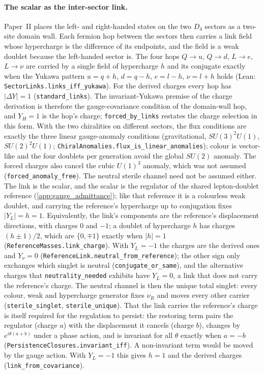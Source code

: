 \paragraph{The scalar as the inter-sector link.} Paper~II places the left- and right-handed states on the two $D_4$ sectors as a two-site domain wall. Each fermion hop between the sectors then carries a link field whose hypercharge is the difference of its endpoints, and the field is a weak doublet because the left-handed sector is. The four hops $Q\to u$, $Q\to d$, $L\to e$, $L\to\nu$ are carried by a single field of hypercharge $h$ and its conjugate exactly when the Yukawa pattern $u=q+h$, $d=q-h$, $e=l-h$, $\nu=l+h$ holds (Lean: \texttt{SectorLinks.links\_iff\_yukawa}). For the derived charges every hop has $|\Delta Y|=1$ (\texttt{standard\_links}). The invariant-Yukawa premise of the charge derivation is therefore the gauge-covariance condition of the domain-wall hop, and $Y_H=1$ is the hop's charge; \texttt{forced\_by\_links} restates the charge selection in this form. With the two chiralities on different sectors, the flux conditions are exactly the three linear gauge-anomaly conditions (gravitational, $SU(3)^2U(1)$, $SU(2)^2U(1)$; \texttt{ChiralAnomalies.flux\_is\_linear\_anomalies}); colour is vector-like and the four doublets per generation avoid the global $SU(2)$ anomaly. The forced charges also cancel the cubic $U(1)^3$ anomaly, which was not assumed (\texttt{forced\_anomaly\_free}). The neutral sterile channel need not be assumed either. The link is the scalar, and the scalar is the regulator of the shared lepton-doublet reference (\cref{app:gauge_admittance}); like that reference it is a colourless weak doublet, and carrying the reference's hypercharge up to conjugation fixes $|Y_L|=h=1$. Equivalently, the link's components are the reference's displacement directions, with charges $0$ and $-1$; a doublet of hypercharge $h$ has charges $(h\pm1)/2$, which are $\{0,\mp1\}$ exactly when $|h|=1$ (\texttt{ReferenceMasses.link\_charge}). With $Y_L=-1$ the charges are the derived ones and $Y_\nu=0$ (\texttt{ReferenceLink.neutral\_from\_reference}); the other sign only exchanges which singlet is neutral (\texttt{conjugate\_or\_same}), and the alternative charges that \texttt{neutrality\_needed} exhibits have $Y_L=0$, a link that does not carry the reference's charge. The neutral channel is then the unique total singlet: every colour, weak and hypercharge generator fixes $\nu_R$ and moves every other carrier (\texttt{sterile\_singlet}, \texttt{sterile\_unique}). That the link carries the reference's charge is itself required for the regulation to persist: the restoring term pairs the regulator (charge $a$) with the displacement it cancels (charge $b$), changes by $e^{i\theta(a+b)}$ under a phase action, and is invariant for all $\theta$ exactly when $a=-b$ (\texttt{PersistenceClosures.invariant\_iff}). A non-invariant term would be moved by the gauge action. With $Y_L=-1$ this gives $h=1$ and the derived charges (\texttt{link\_from\_covariance}).


